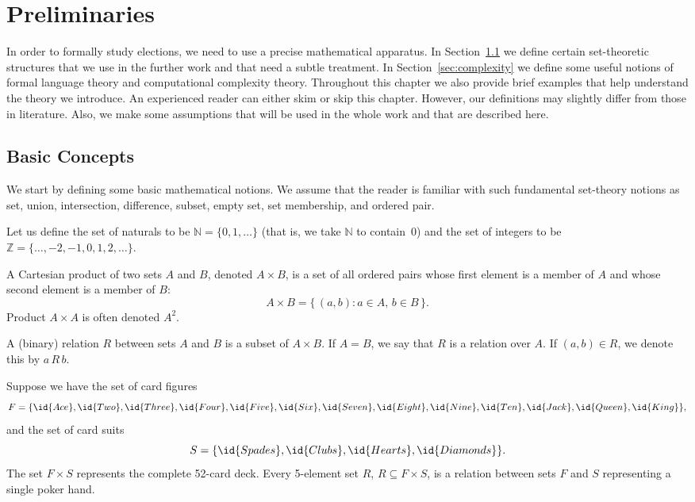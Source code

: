 \chapter{Preliminaries} \label{ch:preliminaries}

In order to formally study elections, we need to use a precise mathematical apparatus.
In Section~\ref{sec:basic} we define certain set-theoretic structures that we use in the further work and that need a subtle treatment.
In Section~\ref{sec:complexity} we define some useful notions of formal language theory and computational complexity theory.
Throughout this chapter we also provide brief examples that help understand the theory we introduce.
An experienced reader can either skim or skip this chapter.
However, our definitions may slightly differ from those in literature.
Also, we make some assumptions that will be used in the whole work and that are described here.

\section{Basic Concepts} \label{sec:basic}

We start by defining some basic mathematical notions.
We assume that the reader is familiar with such fundamental set-theory notions as set, union, intersection, difference, subset, empty set, set membership, and ordered pair.

Let us define the set of naturals to be $\mathbb{N}=\{0,1,\dots\}$ (that is, we take $\mathbb{N}$ to contain~0) and the set of integers to be $\mathbb{Z}=\{\dots,-2,-1,0,1,2,\dots\}$.

\begin{definition}
	A Cartesian product of two sets $A$ and $B$, denoted $A\times B$, is a set of all ordered pairs whose first element is a member of $A$ and whose second element is a member of $B$:
	\[
		A\times B = \{\,(a,b):a\in A,\,b\in B\,\}.
	\]
	Product $A\times A$ is often denoted $A^2$.
\end{definition}

\begin{definition}
    A (binary) relation $R$ between sets $A$ and $B$ is a subset of $A\times B$.
	If $A=B$, we say that $R$ is a relation over $A$.
	If $(a,b)\in R$, we denote this by $a\,R\,b$.
\end{definition}

\begin{Example}
	Suppose we have the set of card figures
	\[
	    F = \{\id{Ace},\id{Two},\id{Three},\id{Four},\id{Five},\id{Six},\id{Seven},\id{Eight},\id{Nine},\id{Ten},\id{Jack},\id{Queen},\id{King}\},
	\]
	and the set of card suits
	\[
		S = \{\id{Spades},\id{Clubs},\id{Hearts},\id{Diamonds}\}.
	\]
	The set $F\times S$ represents the complete 52-card deck.
	Every 5-element set $R$, $R\subseteq F\times S$, is a relation between sets $F$ and $S$ representing a single poker hand.
\end{Example}

